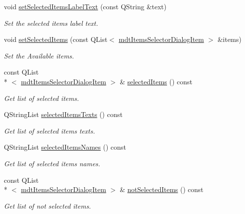 \begin{DoxyCompactItemize}
void \hyperlink{classmdt_items_selector_dialog_a09e9df0c7cac2de513846916f47aa420}{set\-Selected\-Items\-Label\-Text} (const Q\-String \&text)
\begin{DoxyCompactList}\small\item\em Set the selected items label text. \end{DoxyCompactList}\item 
void \hyperlink{classmdt_items_selector_dialog_a02b2ea73af9b9688b90274b3d5b5428e}{set\-Selected\-Items} (const Q\-List$<$ \hyperlink{classmdt_items_selector_dialog_item}{mdt\-Items\-Selector\-Dialog\-Item} $>$ \&items)
\begin{DoxyCompactList}\small\item\em Set the Available items. \end{DoxyCompactList}\item 
const Q\-List\\*
$<$ \hyperlink{classmdt_items_selector_dialog_item}{mdt\-Items\-Selector\-Dialog\-Item} $>$ \& \hyperlink{classmdt_items_selector_dialog_a3fdcd8c8ccead9129b7ee7742a9150f4}{selected\-Items} () const 
\begin{DoxyCompactList}\small\item\em Get list of selected items. \end{DoxyCompactList}\item 
Q\-String\-List \hyperlink{classmdt_items_selector_dialog_adcb596a9e5d183a07a6c072ac7cf7eb0}{selected\-Items\-Texts} () const 
\begin{DoxyCompactList}\small\item\em Get list of selected items texts. \end{DoxyCompactList}\item 
Q\-String\-List \hyperlink{classmdt_items_selector_dialog_af8a1502d4856ceb6e4a4559565b3c385}{selected\-Items\-Names} () const 
\begin{DoxyCompactList}\small\item\em Get list of selected items names. \end{DoxyCompactList}\item 
const Q\-List\\*
$<$ \hyperlink{classmdt_items_selector_dialog_item}{mdt\-Items\-Selector\-Dialog\-Item} $>$ \& \hyperlink{classmdt_items_selector_dialog_af944e51b66c6e492ec74ec6030b281d4}{not\-Selected\-Items} () const 
\begin{DoxyCompactList}\small\item\em Get list of not selected items. \end{DoxyCompactList}\end{DoxyCompactItemize}
